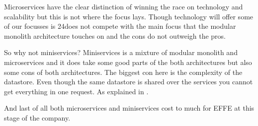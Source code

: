 Microservices have the clear distinction of winning the race on technology and scalability but this is not where the focus lays. Though technology will offer some of our focusses is 24does not compete with the main focus that the modular monolith architecture touches on and the cons do not outweigh the pros.

So why not miniservices? Miniservices is a mixture of modular monolith and microservices and it does take some good parts of the both architectures but also some cons of both architectures. The biggest con here is the complexity of the datastore. Even though the same datastore is shared over the services you cannot get everything in one request. As explained in .

And last of all both microservices and miniservices cost to much for EFFE at this stage of the company. 
